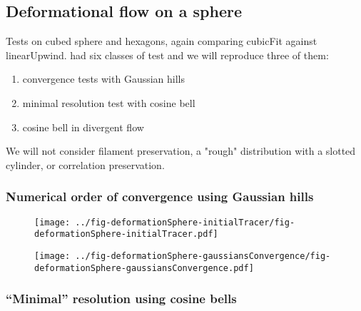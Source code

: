 \subsection{Deformational flow on a sphere}


Tests on cubed sphere and hexagons, again comparing cubicFit against linearUpwind.  \citet{lauritzen2012} had six classes of test and we will reproduce three of them:
\begin{enumerate}
	\item convergence tests with Gaussian hills
	\item minimal resolution test with cosine bell
	\item cosine bell in divergent flow
\end{enumerate}
We will not consider filament preservation, a "rough" distribution with a slotted cylinder, or correlation preservation.

\subsubsection{Numerical order of convergence using Gaussian hills}
\begin{figure}
	\texttt{[image: ../fig-deformationSphere-initialTracer/fig-deformationSphere-initialTracer.pdf]}
	\caption{}
\end{figure}

\begin{figure}
	\texttt{[image: ../fig-deformationSphere-gaussiansConvergence/fig-deformationSphere-gaussiansConvergence.pdf]}
	\caption{}
\end{figure}

\subsubsection{``Minimal'' resolution using cosine bells}

